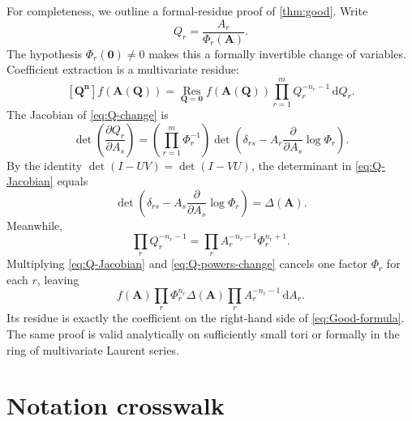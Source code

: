 \documentclass[11pt,oneside]{article}
\numberwithin{equation}{section}
\theoremstyle{plain}
\theoremstyle{definition}
\theoremstyle{remark}
\newcommand{\dd}{\,\mathrm d}
\newcommand{\Res}{\operatorname*{Res}}
\newcommand{\multi}[1]{\bm{#1}}
\begin{document}
For completeness, we outline a formal-residue proof of
\cref{thm:good}.  Write
\begin{equation}\label{eq:Q-change}
 Q_r=\frac{A_r}{\Phi_r(\multi A)}.
\end{equation}
The hypothesis \(\Phi_r(\multi0)\ne0\) makes this a formally invertible
change of variables.  Coefficient extraction is a multivariate residue:
\begin{equation}\label{eq:coeff-residue}
 [\multi Q^{\multi n}]f(\multi A(\multi Q))
 =\Res_{\multi Q=\multi0}
 f(\multi A(\multi Q))
 \prod_{r=1}^mQ_r^{-n_r-1}\dd Q_r.
\end{equation}
The Jacobian of \cref{eq:Q-change} is
\begin{equation}\label{eq:Q-Jacobian}
 \det\!\left(\frac{\partial Q_r}{\partial A_s}\right)
 =\left(\prod_{r=1}^m\Phi_r^{-1}\right)
 \det\!\left(
  \delta_{rs}-A_r\frac{\partial}{\partial A_s}
                         \log\Phi_r
 \right).
\end{equation}
By the identity \(\det(I-UV)=\det(I-VU)\), the determinant in
\cref{eq:Q-Jacobian} equals
\begin{equation}\label{eq:Good-det-equivalent}
 \det\!\left(
  \delta_{rs}-A_s\frac{\partial}{\partial A_s}
                         \log\Phi_r
 \right)=\Delta(\multi A).
\end{equation}
Meanwhile,
\begin{equation}\label{eq:Q-powers-change}
 \prod_rQ_r^{-n_r-1}
 =\prod_rA_r^{-n_r-1}\Phi_r^{n_r+1}.
\end{equation}
Multiplying \cref{eq:Q-Jacobian} and
\cref{eq:Q-powers-change} cancels one factor \(\Phi_r\) for each \(r\),
leaving
\[
 f(\multi A)\prod_r\Phi_r^{n_r}\Delta(\multi A)
 \prod_rA_r^{-n_r-1}\dd A_r.
\]
Its residue is exactly the coefficient on the right-hand side of
\cref{eq:Good-formula}.  The same proof is valid analytically on sufficiently
small tori or formally in the ring of multivariate Laurent series.

\section{Notation crosswalk}\label{app:notation}
\end{document}
